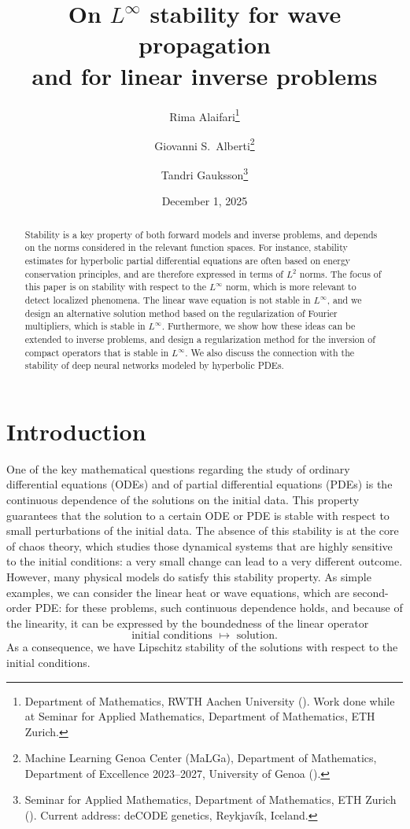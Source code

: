 \documentclass{article}
\title{On $L^\infty$ stability for wave propagation \\ and for  linear inverse problems}
\author{
Rima Alaifari\thanks{
                Department of Mathematics, RWTH Aachen University
(\email{rima.alaifari@rwth-aachen.de}). Work done while at Seminar for Applied Mathematics, Department of Mathematics, ETH Zurich.
                }
\and Giovanni S.\ Alberti\thanks{
                Machine Learning Genoa Center (MaLGa), Department of Mathematics, Department of Excellence 2023–2027, University of Genoa (\email{giovanni.alberti@unige.it}).
                }
\and Tandri Gauksson\thanks{Seminar for Applied Mathematics, Department of Mathematics, ETH Zurich
(\email{tandri.gauksson@decode.is}). Current address: deCODE genetics,  Reykjavík, Iceland.}}
\date{December 1, 2025}
\theoremstyle{definition}
\begin{document}
\maketitle



\begin{abstract}



Stability is a key property of both forward models and inverse problems, and depends on the norms considered in the relevant function spaces. For instance,  stability estimates for hyperbolic partial differential equations are often based on energy conservation principles, and are therefore expressed in terms of $L^2$ norms. The focus of this paper is on stability with respect to the $L^\infty$ norm, which is more relevant to detect localized phenomena.  The linear wave equation is not stable in  $L^\infty$, and we design an alternative solution method based on the regularization of Fourier multipliers, which is stable in $L^\infty$. Furthermore, we show how these ideas can be extended to inverse problems, and design a regularization method for the inversion of compact operators that is stable in $L^\infty$. We also discuss the connection with the stability of deep neural networks modeled by hyperbolic PDEs.

\end{abstract}




\section{Introduction}\label{sec:intro}

One of the key mathematical questions regarding the study of ordinary differential equations (ODEs) and of partial differential equations (PDEs) is the continuous dependence of the solutions on the initial data. This property guarantees that the solution to a certain ODE or PDE is stable with respect to small perturbations of the initial data. The absence of this stability is at the core of chaos theory, which studies those dynamical systems that are highly sensitive to the initial conditions: a very small change can lead to a very different outcome. However, many physical models do satisfy this stability property.
As simple examples, we can consider the linear heat or wave equations, which are second-order PDE: for these problems, such continuous dependence holds, and because of the linearity, it can be expressed by the boundedness of the linear operator
\[
\text{initial conditions $\;\longmapsto\;$ solution.}
\]
As a consequence, we have Lipschitz stability of the solutions with respect to the initial conditions.
\end{document}
